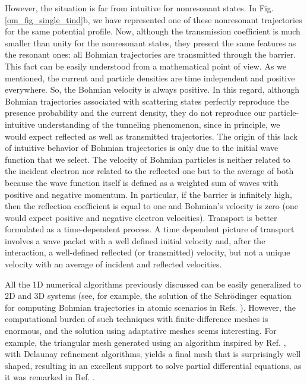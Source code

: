 \documentclass[nofootinbib, secnumarabic, amsmath, nobibnotes,11pt,aps,pra, floatfix]{revtex4-1}
\newcommand{\fref}[1]{Fig. \ref{#1}}
\begin{document}
However, the situation is far from intuitive for nonresonant states. In \fref{om_fig_single_tind}b, we have represented one of these nonresonant trajectories for the same potential profile. Now, although the transmission coefficient is much smaller than unity for the nonresonant states, they present the same features as the resonant ones: all Bohmian trajectories are transmitted through the barrier. This fact can be easily understood from a mathematical point of view. As we mentioned, the current and particle densities are time independent and positive everywhere. So, the Bohmian velocity is always positive. In this regard, although Bohmian trajectories associated with scattering states perfectly reproduce the presence probability and the current density, they do not reproduce our particle-intuitive understanding of the tunneling phenomenon, since in principle, we would expect reflected as well as transmitted trajectories. The origin of this lack of intuitive behavior of Bohmian trajectories is only due to the initial wave function that we select. The velocity of Bohmian particles is neither related to the incident electron nor related to the reflected one but to the average of both because the wave function itself is defined as a weighted sum of waves with positive and negative momentum. In particular, if the barrier is infinitely high, then the reflection coefficient is equal to one and Bohmian's velocity is zero (one would expect positive and negative electron velocities). Transport is better formulated as a time-dependent process. A time dependent picture of transport involves a wave packet with a well defined initial velocity and, after the interaction, a well-defined reflected (or transmitted) velocity, but not a unique velocity with an average of incident and reflected velocities. 

All the 1D numerical algorithms previously discussed can be easily
generalized to 2D and 3D systems (see, for example, the solution of
the Schr\"odinger equation for computing Bohmian trajectories in
atomic scenarios in Refs. \cite{om.mompart1,om.mompart2}). However,
the computational burden of such techniques with finite-difference
meshes is enormous, and the solution using adaptative meshes seems interesting. For example, the triangular mesh generated using
an algorithm inspired by Ref. \cite{om.Persson}, with Delaunay refinement
algorithms, yields a final mesh that is surprisingly well shaped,
resulting in an excellent support to solve partial differential
equations, as it was remarked in Ref. \cite{om.Pinto}.\vspace*{-9pt}
\end{document}
